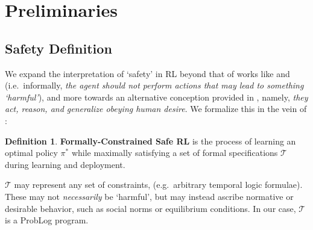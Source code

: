\documentclass{ecai}
\theoremstyle{plain}
\theoremstyle{definition}
\newtheorem{definition}[theorem]{Definition}
\theoremstyle{remark}
\begin{document}
\section{Preliminaries}


\subsection{Safety Definition}\label{sec:safety}
We expand the interpretation of `safety' in RL beyond that of works like \citet{elsayed2021safe} and \citet{yang2023safe} (i.e.\ informally, \textit{the agent should not perform actions that may lead to something `harmful'}), and more towards an alternative conception provided in \citet[][pg.\ 3]{gu2024review}, namely, \textit{they act, reason, and generalize obeying human desire}. We formalize this in the vein of \citet{alshiekh2018safe}:

\begin{definition}\label{def:safety}
    \textbf{Formally-Constrained Safe RL} is the process of learning an optimal policy $\pi^*$ while maximally satisfying a set of formal specifications $\mathcal{T}$ during learning and deployment.
\end{definition}

$\mathcal{T}$ may represent any set of constraints, (e.g.\ arbitrary temporal logic formulae). These may not \textit{necessarily} be `harmful', but may instead ascribe normative or desirable behavior, such as social norms or equilibrium conditions.
In our case, $\mathcal{T}$ is a ProbLog program.
\end{document}
